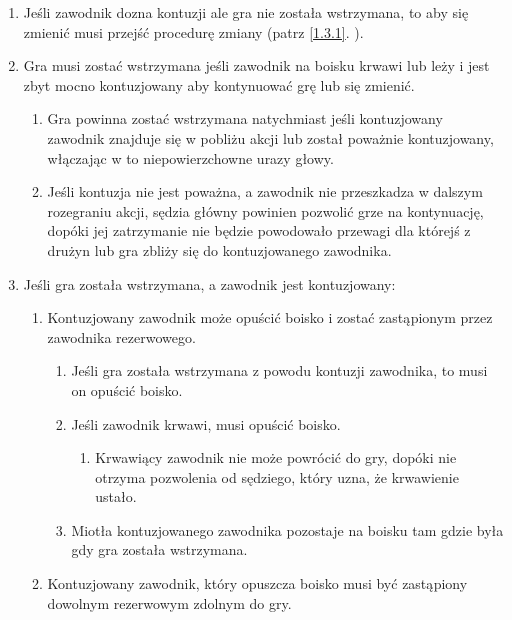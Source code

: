 \documentclass[11pt,a4paper]{article}
\newcommand{\myref}[1]{\ref{#1}. \nameref{#1}}
\begin{document}
\begin{enumerate}

\item
  Jeśli zawodnik dozna kontuzji ale gra nie została wstrzymana, to aby
  się zmienić musi przejść procedurę zmiany (patrz \myref{1.3.1}).
\item
  Gra musi zostać wstrzymana jeśli zawodnik na boisku krwawi lub leży i
  jest zbyt mocno kontuzjowany aby kontynuować grę lub się zmienić.

  \begin{enumerate}
  
  \item
    Gra powinna zostać wstrzymana natychmiast jeśli kontuzjowany
    zawodnik znajduje się w pobliżu akcji lub został poważnie
    kontuzjowany, włączając w to niepowierzchowne urazy głowy.
  \item
    Jeśli kontuzja nie jest poważna, a zawodnik nie przeszkadza w
    dalszym rozegraniu akcji, sędzia główny powinien pozwolić grze na
    kontynuację, dopóki jej zatrzymanie nie będzie powodowało przewagi
    dla którejś z drużyn lub gra zbliży się do kontuzjowanego zawodnika.
  \end{enumerate}
\item
  Jeśli gra została wstrzymana, a zawodnik jest kontuzjowany:

  \begin{enumerate}
  
  \item
    Kontuzjowany zawodnik może opuścić boisko i zostać zastąpionym przez
    zawodnika rezerwowego.

    \begin{enumerate}
    
    \item
      Jeśli gra została wstrzymana z powodu kontuzji zawodnika, to musi
      on opuścić boisko.
    \item
      Jeśli zawodnik krwawi, musi opuścić boisko.

      \begin{enumerate}
      
      \item
        Krwawiący zawodnik nie może powrócić do gry, dopóki nie otrzyma
        pozwolenia od sędziego, który uzna, że krwawienie ustało.
      \end{enumerate}
    \item
      Miotła kontuzjowanego zawodnika pozostaje na boisku tam gdzie była
      gdy gra została wstrzymana.
    \end{enumerate}
  \item
    Kontuzjowany zawodnik, który opuszcza boisko musi być zastąpiony
    dowolnym rezerwowym zdolnym do gry.


\end{enumerate}
\end{enumerate}
\end{document}
